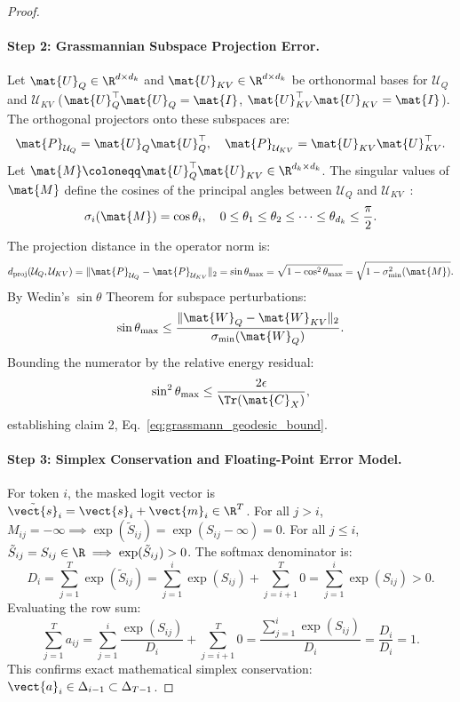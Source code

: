 \begin{proof}
\paragraph{Step 2: Grassmannian Subspace Projection Error.}
Let $\mat{U}_Q \in \R^{d \times d_k}$ and $\mat{U}_{KV} \in \R^{d \times d_k}$ be orthonormal bases for $\mathcal{U}_Q$ and $\mathcal{U}_{KV}$ ($\mat{U}_Q^\top \mat{U}_Q = \mat{I}$, $\mat{U}_{KV}^\top \mat{U}_{KV} = \mat{I}$).
The orthogonal projectors onto these subspaces are:
\begin{equation}
\mat{P}_{\mathcal{U}_Q} = \mat{U}_Q \mat{U}_Q^\top, \quad \mat{P}_{\mathcal{U}_{KV}} = \mat{U}_{KV} \mat{U}_{KV}^\top.
\end{equation}
Let $\mat{M} \coloneqq \mat{U}_Q^\top \mat{U}_{KV} \in \R^{d_k \times d_k}$.
The singular values of $\mat{M}$ define the cosines of the principal angles between $\mathcal{U}_Q$ and $\mathcal{U}_{KV}$~\cite{edelman1998geometry}:
\begin{equation}
\sigma_i(\mat{M}) = \cos \theta_i, \quad 0 \le \theta_1 \le \theta_2 \le \dots \le \theta_{d_k} \le \frac{\pi}{2}.
\end{equation}
The projection distance in the operator norm is:
\begin{equation}
d_{\text{proj}}(\mathcal{U}_Q, \mathcal{U}_{KV}) = \|\mat{P}_{\mathcal{U}_Q} - \mat{P}_{\mathcal{U}_{KV}}\|_2 = \sin \theta_{\max} = \sqrt{1 - \cos^2 \theta_{\max}} = \sqrt{1 - \sigma_{\min}^2(\mat{M})}.
\end{equation}
By Wedin's $\sin \theta$ Theorem for subspace perturbations:
\begin{equation}
\sin \theta_{\max} \le \frac{\|\mat{W}_Q - \mat{W}_{KV}\|_2}{\sigma_{\min}(\mat{W}_Q)}.
\end{equation}
Bounding the numerator by the relative energy residual:
\begin{equation}
\sin^2 \theta_{\max} \le \frac{2\epsilon}{\Tr(\mat{C}_X)},
\end{equation}
establishing claim 2, Eq.~\eqref{eq:grassmann_geodesic_bound}.

\paragraph{Step 3: Simplex Conservation and Floating-Point Error Model.}
For token $i$, the masked logit vector is $\tilde{\vect{s}}_i = \vect{s}_i + \vect{m}_i \in \R^T$.
For all $j > i$, $M_{ij} = -\infty \implies \exp(\tilde{S}_{ij}) = \exp(S_{ij} - \infty) = 0$.
For all $j \le i$, $\tilde{S}_{ij} = S_{ij} \in \R \implies \exp(\tilde{S}_{ij}) > 0$.
The softmax denominator is:
\begin{equation}
D_i = \sum_{j=1}^T \exp(\tilde{S}_{ij}) = \sum_{j=1}^i \exp(S_{ij}) + \sum_{j=i+1}^T 0 = \sum_{j=1}^i \exp(S_{ij}) > 0.
\end{equation}
Evaluating the row sum:
\begin{equation}
\sum_{j=1}^T a_{ij} = \sum_{j=1}^i \frac{\exp(S_{ij})}{D_i} + \sum_{j=i+1}^T 0 = \frac{\sum_{j=1}^i \exp(S_{ij})}{D_i} = \frac{D_i}{D_i} = 1.
\end{equation}
This confirms exact mathematical simplex conservation: $\vect{a}_i \in \Delta_{i-1} \subset \Delta_{T-1}$.


\end{proof}
